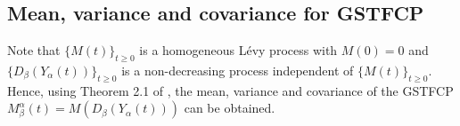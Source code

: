 \documentclass[11pt,oneside,reqno]{amsart}
\theoremstyle{definition}
\theoremstyle{remarkstyle}
\begin{document}
\subsection{Mean, variance and covariance for GSTFCP}
Note that $\{M(t)\}_{t\geq 0}$ is a homogeneous L\'{e}vy process with $M(0)=0$ and $\{D_\beta(Y_\alpha(t))\}_{t\geq 0}$ is a non-decreasing process independent of $\{M(t)\}_{t\geq 0}$. Hence, using Theorem 2.1 of \citet{Leonenko2014}, the mean, variance and covariance of the GSTFCP $M_{\beta}^{\alpha}(t)=M(D_\beta(Y_\alpha(t)))$ can be obtained.
\end{document}
